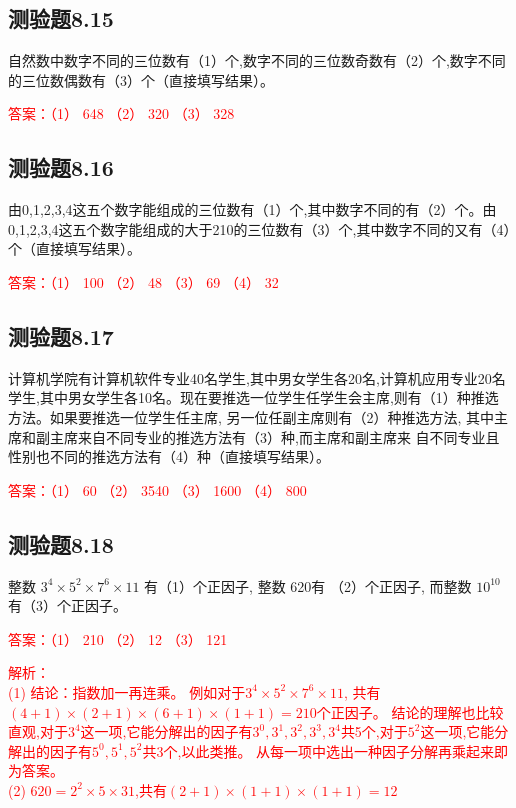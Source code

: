 \documentclass[UTF8, heading=true]{ctexart}
\begin{document}
\subsection{测验题8.15}

自然数中数字不同的三位数有（1）个,数字不同的三位数奇数有（2）个,数字不同的三位数偶数有（3）个（直接填写结果）。

\textcolor{red}{答案：（1） 648 （2） 320 （3） 328}

\subsection{测验题8.16}

由0,1,2,3,4这五个数字能组成的三位数有（1）个,其中数字不同的有（2）个。由0,1,2,3,4这五个数字能组成的大于210的三位数有（3）个,其中数字不同的又有（4）个（直接填写结果）。

\textcolor{red}{答案：（1） 100 （2） 48 （3） 69 （4） 32}

\subsection{测验题8.17}

计算机学院有计算机软件专业40名学生,其中男女学生各20名,计算机应用专业20名学生,其中男女学生各10名。现在要推选一位学生任学生会主席,则有（1）种推选方法。如果要推选一位学生任主席,
另一位任副主席则有（2）种推选方法,
其中主席和副主席来自不同专业的推选方法有（3）种,而主席和副主席来
自不同专业且性别也不同的推选方法有（4）种（直接填写结果）。

\textcolor{red}{答案：（1） 60 （2） 3540 （3） 1600 （4） 800}

\subsection{测验题8.18}

整数 $3^4 \times 5^2 \times 7^6 \times 11$ 有（1）个正因子, 整数 620有 （2）个正因子,
而整数 $10^{10}$ 有（3）个正因子。

\textcolor{red}{答案：（1） 210 （2） 12 （3） 121}

\textcolor{red}{解析：\\ \indent(1) 结论：指数加一再连乘。 例如对于$3^4 \times 5^2 \times 7^6 \times 11$,
共有$(4+1) \times (2+1) \times (6+1) \times (1+1)=210$个正因子。
结论的理解也比较直观,对于$3^4$这一项,它能分解出的因子有$3^0,3^1,3^2,3^3,3^4$共5个,对于$5^2$这一项,它能分解出的因子有$5^0,5^1,5^2$共3个,以此类推。
从每一项中选出一种因子分解再乘起来即为答案。\\ \indent(2) $620=2^2 \times 5 \times 31$,共有$(2+1) \times (1+1) \times (1+1)=12$}
\end{document}
